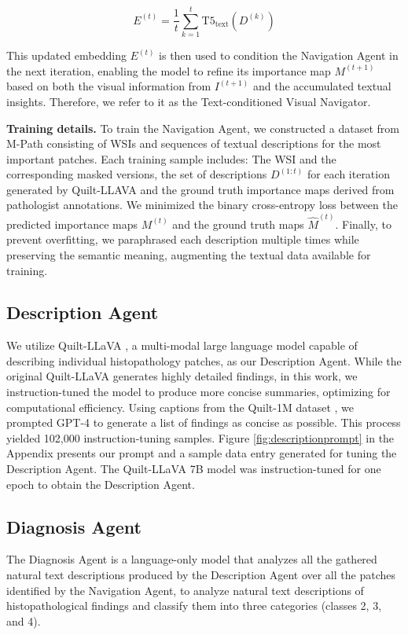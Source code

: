 \begin{equation}
    E^{(t)} = \frac{1}{t} \sum_{k=1}^{t} \text{T5}_{\text{text}}(D^{(k)})
\end{equation}

This updated embedding $E^{(t)}$ is then used to condition the Navigation Agent in the next iteration, enabling the model to refine its importance map $M^{(t+1)}$ based on both the visual information from $I^{(t+1)}$ and the accumulated textual insights. Therefore, we refer to it as the Text-conditioned Visual Navigator.




\noindent
\textbf{Training details.} To train the Navigation Agent, we constructed a dataset from M-Path \cite{onega2018accuracy} consisting of WSIs and sequences of textual descriptions for the most important patches. Each training sample includes: The WSI and the corresponding masked versions, the set of descriptions $D^{(1:t)}$ for each iteration generated by Quilt-LLAVA \cite{seyfioglu2024quilt} and the ground truth importance maps derived from pathologist annotations. We minimized the binary cross-entropy loss between the predicted importance maps $M^{(t)}$ and the ground truth maps $\hat{M}^{(t)}$. Finally, to prevent overfitting, we paraphrased each description multiple times while preserving the semantic meaning, augmenting the textual data available for training.



\subsection{Description Agent}

We utilize Quilt-LLaVA \cite{seyfioglu2024quilt}, a multi-modal large language model capable of describing individual histopathology patches, as our Description Agent. While the original Quilt-LLaVA generates highly detailed findings, in this work, we instruction-tuned the model to produce more concise summaries, optimizing for computational efficiency. Using captions from the Quilt-1M dataset \cite{ikezogwo2024quilt}, we prompted GPT-4 to generate a list of findings as concise as possible. This process yielded 102,000 instruction-tuning samples. Figure \ref{fig:descriptionprompt} in the Appendix presents our prompt and a sample data entry generated for tuning the Description Agent. The Quilt-LLaVA 7B model was instruction-tuned for one epoch to obtain the Description Agent.

\subsection{Diagnosis Agent}
\label{trajectories}
The Diagnosis Agent is a language-only model that analyzes all the gathered natural text descriptions produced by the Description Agent over all the patches identified by the Navigation Agent, to analyze natural text descriptions of histopathological findings and classify them into three categories (classes 2, 3, and 4).

